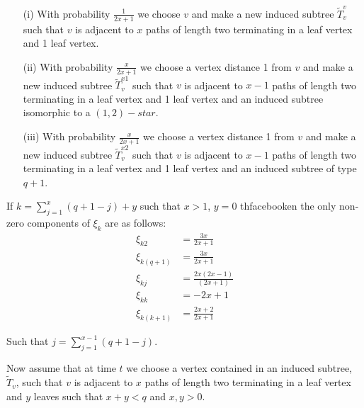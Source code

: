 \documentclass[12pt]{article} %
\theoremstyle{definition}
\begin{document}
\begin{itemize}
\item[(i)] With probability $\frac {1}{2x +1}$ we choose $v$ and make a new induced subtree $\tilde{T}_{v}^{v}$ such that $v$ is adjacent to $x$ paths of length two terminating in a leaf vertex and 1 leaf vertex.
\item[(ii)] With probability $\frac {x}{2x +1}$ we choose a vertex distance 1 from $v$ and make a new induced subtree $\tilde{T}_{v}^{x1}$ such that $v$ is adjacent to $x-1$ paths of length two terminating in a leaf vertex and 1 leaf vertex and an induced subtree isomorphic to a $(1,2)-star$.  
\item[(iii)] With probability $\frac {x}{2x +1}$ we choose a vertex distance 1 from $v$ and make a new induced subtree $\tilde{T}_{v}^{x2}$ such that $v$ is adjacent to $x-1$ paths of length two terminating in a leaf vertex and 1 leaf vertex and an induced subtree of type $q+1$.
\end{itemize}

If $k= \sum_{j=1}^{x}(q+ 1 -j) + y$ such that $x>1$, $y=0$  thfacebooken the only non-zero components of $\xi_{k}$ are as follows:
 \begin{align*}
\xi_{k2} &= \frac{3x}{2x+1}\\
\xi_{k(q+1)} &= \frac{3x}{2x+1}\\
\xi_{kj} &= \frac{2x(2x-1)}{(2x+1)}\\
\xi_{kk} &= -2x+1 \\
\xi_{k(k+1)} &= \frac{2x + 2}{2x + 1}
\end{align*}

Such that $j= \sum_{j=1}^{x-1}(q+ 1 - j)$.

Now assume that at time $t$ we choose a vertex contained in an induced subtree, $\tilde{T}_{v}$, such that $v$ is adjacent to $x$ paths of length two terminating in a leaf vertex and $y$ leaves such that $x+y<q$ and $x,y>0$.    
\end{document}
